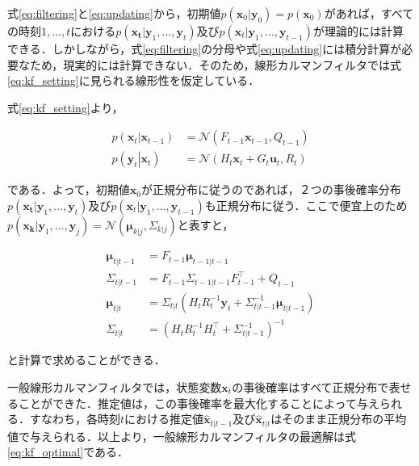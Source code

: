 式\ref{eq:filtering}と\ref{eq:updating}から，初期値$p(\bm{x}_0 | \bm{y}_0) = p(\bm{x}_0)$があれば，すべての時刻$1,...,t$における$p(\bm{x_t} | \bm{y}_1,..., \bm{y}_t)$及び$p(\bm{x}_t | \bm{y}_1,..., \bm{y}_{t-1})$が理論的には計算できる．しかしながら，式\ref{eq:filtering}の分母や式\ref{eq:updating}には積分計算が必要なため，現実的には計算できない．そのため，線形カルマンフィルタでは式\ref{eq:kf_setting}に見られる線形性を仮定している．
\par
式\ref{eq:kf_setting}より，

\begin{equation}
    \begin{aligned}
        p(\left.\bm{x}_t\right|\bm{x}_{t-1}) &= \mathcal{N}(F_{t-1} \bm{x}_{t-1}, Q_{t-1})
        \\ p(\left. \bm{y}_t \right| \bm{x}_t) &= \mathcal{N}(H_t \bm{x}_t + G_{t} \bm{u}_{t}, R_t)
    \end{aligned}
\end{equation}

である．よって，初期値$\bm{x}_0$が正規分布に従うのであれば，２つの事後確率分布$p(\bm{x_t} | \bm{y}_1,..., \bm{y}_t)$及び$p(\bm{x}_t | \bm{y}_1,..., \bm{y}_{t-1})$も正規分布に従う．ここで便宜上のため$p(\bm{x_k} | \bm{y}_1,..., \bm{y}_j) = \mathcal{N}(\bm{\mu}_{k|j}, \Sigma_{k|j})$と表すと，

\begin{equation}
    \label{eq:mu_sigma}
    \begin{aligned}
        \bm{\mu}_{t|t-1} &= F_{t-1} \bm{\mu}_{t-1|t-1}
        \\\Sigma_{t|t-1} &= F_{t-1} \Sigma_{t-1|t-1} F_{t-1}^{\top} + Q_{t-1}
        \\\bm{\mu}_{t|t} &= \Sigma_{t|t} \left( H_t R_t^{-1} \bm{y}_t + \Sigma_{t|t-1}^{-1} \bm{\mu}_{t|t-1} \right)
        \\\Sigma_{t|t} &= \left( H_t R_t^{-1} H_t^{\top} + \Sigma_{t|t-1}^{-1}\right)^{-1}
    \end{aligned}
\end{equation}

と計算で求めることができる．
\par

一般線形カルマンフィルタでは，状態変数$\bm{x}_t$の事後確率はすべて正規分布で表せることができた．推定値は，この事後確率を最大化することによって与えられる．すなわち，各時刻$t$における推定値$\hat{\bm{x}}_{t|t-1}$及び$\hat{\bm{x}}_{t|t}$はそのまま正規分布の平均値で与えられる．以上より，一般線形カルマンフィルタの最適解は式\ref{eq:kf_optimal}である．

